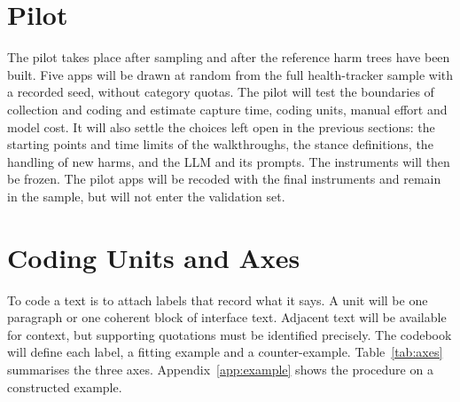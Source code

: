 \section{Pilot} The pilot takes place after sampling and after the reference
harm trees have been built. Five apps will be drawn at random from the full
health-tracker sample with a recorded seed, without category quotas. The pilot will
test the boundaries of collection and coding and estimate capture time, coding
units, manual effort and model cost. It will also settle the choices left open
in the previous sections: the starting points and time limits of the
walkthroughs, the stance definitions, the handling of new harms, and the LLM
and its prompts. The instruments will then be frozen. The pilot apps will be
recoded with the final instruments and remain in the sample, but will not
enter the validation set.

\section{Coding Units and Axes} To code a text is to attach labels that
record what it says. A unit will be one paragraph or one coherent block of
interface text. Adjacent text will be available for context, but supporting quotations must
be identified precisely. The codebook will define each label, a fitting
example and a counter-example. Table~\ref{tab:axes} summarises the three axes.
Appendix~\ref{app:example} shows the procedure on a constructed example.


